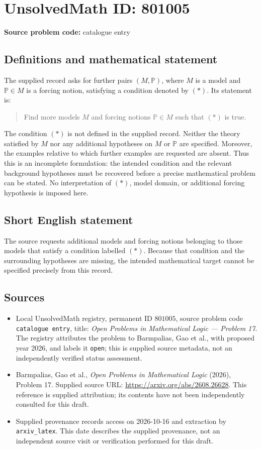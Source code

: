 \documentclass[11pt]{article}
\begin{document}
\section*{UnsolvedMath ID: 801005}
\textbf{Source problem code:} catalogue entry
\subsection{Definitions and mathematical statement}
The supplied record asks for further pairs \((M,\mathbb{P})\), where \(M\) is a model and \(\mathbb{P}\in M\) is a forcing notion, satisfying a condition denoted by \((*)\). Its statement is:
\begin{quote}
Find more models \(M\) and forcing notions \(\mathbb{P}\in M\) such that \((*)\) is true.
\end{quote}
The condition \((*)\) is not defined in the supplied record. Neither the theory satisfied by \(M\) nor any additional hypotheses on \(M\) or \(\mathbb{P}\) are specified. Moreover, the examples relative to which further examples are requested are absent. Thus this is an incomplete formulation: the intended condition and the relevant background hypotheses must be recovered before a precise mathematical problem can be stated. No interpretation of \((*)\), model domain, or additional forcing hypothesis is imposed here.
\subsection{Short English statement}
The source requests additional models and forcing notions belonging to those models that satisfy a condition labelled \((*)\). Because that condition and the surrounding hypotheses are missing, the intended mathematical target cannot be specified precisely from this record.
\subsection{Sources}
\begin{itemize}
\item Local UnsolvedMath registry, permanent ID \(801005\), source problem code \texttt{catalogue entry}, title: \emph{Open Problems in Mathematical Logic --- Problem 17}. The registry attributes the problem to Barmpalias, Gao et al., with proposed year 2026, and labels it \texttt{open}; this is supplied source metadata, not an independently verified status assessment.
\item Barmpalias, Gao et al., \emph{Open Problems in Mathematical Logic} (2026), Problem 17. Supplied source URL: \url{https://arxiv.org/abs/2608.26628}. This reference is supplied attribution; its contents have not been independently consulted for this draft.
\item Supplied provenance records access on 2026-10-16 and extraction by \texttt{arxiv\_latex}. This date describes the supplied provenance, not an independent source visit or verification performed for this draft.
\end{itemize}
\end{document}
